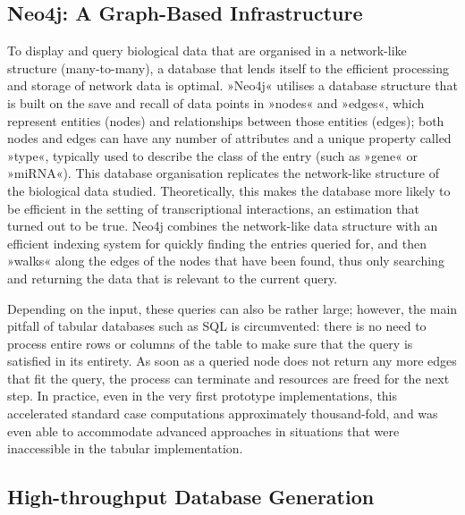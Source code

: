 \subsection{Neo4j: A Graph-Based Infrastructure}
To display and query biological data that are organised in a network-like structure (many-to-many), a database that lends itself to the efficient processing and storage of network data is optimal. »Neo4j« utilises a database structure that is built on the save and recall of data points in »nodes« and »edges«, which represent entities (nodes) and relationships between those entities (edges); both nodes and edges can have any number of attributes and a unique property called »type«, typically used to describe the class of the entry (such as »gene« or »miRNA«). This database organisation replicates the network-like structure of the biological data studied. Theoretically, this makes the database more likely to be efficient in the setting of transcriptional interactions, an estimation that turned out to be true. Neo4j combines the network-like data structure with an efficient indexing system for quickly finding the entries queried for, and then »walks« along the edges of the nodes that have been found, thus only searching and returning the data that is relevant to the current query.


Depending on the input, these queries can also be rather large; however, the main pitfall of tabular databases such as SQL is circumvented: there is no need to process entire rows or columns of the table to make sure that the query is satisfied in its entirety. As soon as a queried node does not return any more edges that fit the query, the process can terminate and resources are freed for the next step. In practice, even in the very first prototype implementations, this accelerated standard case computations approximately thousand-fold, and was even able to accommodate advanced approaches in situations that were inaccessible in the tabular implementation.

\subsection{High-throughput Database Generation}

